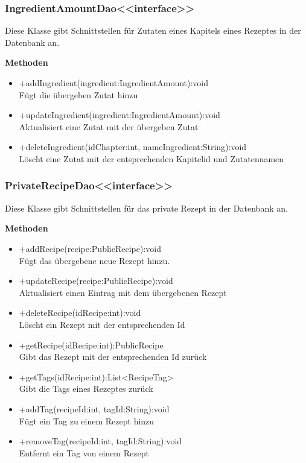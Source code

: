 \subsubsection{IngredientAmountDao<<interface>>}
Diese Klasse gibt Schnittstellen für Zutaten eines Kapitels eines Rezeptes in der Datenbank an.

\textbf{Methoden}
\begin{itemize}
	\item +addIngredient(ingredient:IngredientAmount):void \\Fügt die übergeben Zutat hinzu
	\item +updateIngredient(ingredient:IngredientAmount):void \\Aktualisiert eine Zutat mit der übergeben Zutat
	\item +deleteIngredient(idChapter:int, nameIngredient:String):void \\Löscht eine Zutat mit der entsprechenden Kapitelid und Zutatennamen
\end{itemize}

\subsubsection{PrivateRecipeDao<<interface>>}
Diese Klasse gibt Schnittstellen für das private Rezept in der Datenbank an.

\textbf{Methoden}
\begin{itemize}
	\item +addRecipe(recipe:PublicRecipe):void \\Fügt das übergebene neue Rezept hinzu.
	\item +updateRecipe(recipe:PublicRecipe):void \\Aktualisiert einen Eintrag mit dem übergebenen Rezept
	\item +deleteRecipe(idRecipe:int):void \\Löscht ein Rezept mit der entsprechenden Id
	\item +getRecipe(idRecipe:int):PublicRecipe \\Gibt das Rezept mit der entsprechenden Id zurück
	\item +getTags(idRecipe:int):List<RecipeTag> \\Gibt die Tags eines Rezeptes zurück
	\item +addTag(recipeId:int, tagId:String):void \\Fügt ein Tag zu einem Rezept hinzu
	\item +removeTag(recipeId:int, tagId:String):void \\Entfernt ein Tag von einem Rezept
\end{itemize}

